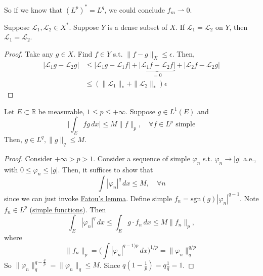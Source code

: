   So if we know that $(L^p)^\ast = L^q$, we could conclude $f_m \rightharpoonup 0$. 

  \begin{lemma}
    \label{thm:vanishing-integral-against-simple-functions}
    Suppose $\mathcal{L}_1, \mathcal{L}_2 \in X^\ast$. Suppose $Y$ is a dense subset of $X$. If $\mathcal{L}_1 = \mathcal{L}_2$ on $Y$, then $\mathcal{L}_1 = \mathcal{L}_2$. 
  \end{lemma}
  \begin{proof}
    Take any $g \in X$. Find $f \in Y$ s.t. $\|f - g\|_X \leq \epsilon$. Then, 
    \begin{align}
      |\mathcal{L}_1 g - \mathcal{L}_2 g| 
        & \leq |\mathcal{L}_1 g - \mathcal{L}_1 f| + \underbrace{|\mathcal{L}_1 f - \mathcal{L}_2 f|}_{=0} + |\mathcal{L}_2 f - \mathcal{L}_2 g| \\ 
        & \leq (\|\mathcal{L}_1\|_\ast + \| \mathcal{L}_2\|_\ast) \epsilon
    \end{align}
  \end{proof}

  \begin{lemma}
    \label{thm:riesz-representation-on-a-finite-interval}
 
    Let $E \subset \mathbb{R}$ be measurable, $1 \leq p \leq +\infty$. Suppose $g \in L^1 (E)$ and 
    \begin{equation}
      \bigg| \int_E f g \,dx \bigg| \leq M \| f\|_p, \quad \forall f \in L^p \text{ simple}
    \end{equation}
    Then, $g \in L^q, \|g\|_q \leq M$. 
  \end{lemma}
  \begin{proof}
    Consider $+\infty > p > 1$. Consider a sequence of simple $\varphi_n$ s.t. $\varphi_n \to |g|$ a.e., with $0 \leq \varphi_n \leq |g|$. Then, it suffices to show that 
    \begin{equation}
      \int | \varphi_n|^q \,dx \leq M, \quad \forall n
    \end{equation}
    since we can just invoke \hyperref[mt-thm:fatous-lemma]{Fatou's lemma}. Define simple $f_n = \mathrm{sgn}(g) |\varphi_n|^{q-1}$. Note $f_n \in L^p$ (\hyperref[mt-def:simple-functions]{simple functions}). Then 
    \begin{equation}
      \int_E |\varphi_n|^q\,dx \leq  \int_E g \cdot f_n \,dx \leq M \|f_n \|_p, 
    \end{equation}
    where 
    \begin{equation}
      \|f_n\|_p = \bigg( \int | \varphi_n|^{q-1)p} \,dx \bigg)^{1/p} = \| \varphi_n \|_q^{q/p} 
    \end{equation}
    So $\| \varphi_n \|_q^{q- \frac{q}{p}} = \|\varphi_n\|_q \leq M$. Since $q(1 - \frac{1}{p}) = q \frac{1}{q} = 1$. 
  \end{proof}

